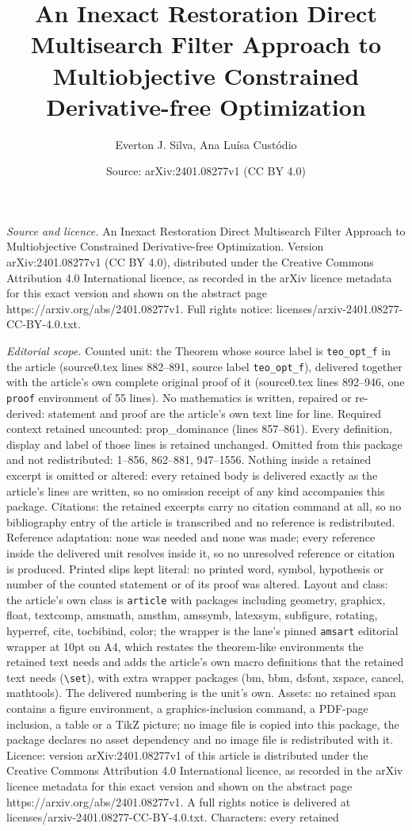 \documentclass[10pt,a4paper]{amsart}
\title[An Inexact Restoration Direct Multisearch Filter Approach to]{An Inexact Restoration Direct Multisearch Filter Approach to Multiobjective Constrained Derivative-free Optimization}
\author{Everton J. Silva, Ana Lu\'isa Cust\'odio}
\date{Source: arXiv:2401.08277v1 (CC BY 4.0)}
\begin{document}
\maketitle

\noindent\emph{Source and licence.} An Inexact Restoration Direct Multisearch Filter Approach to Multiobjective Constrained Derivative-free Optimization. Version arXiv:2401.08277v1 (CC BY 4.0), distributed under the Creative Commons Attribution 4.0 International licence, as recorded in the arXiv licence metadata for this exact version and shown on the abstract page https://arxiv.org/abs/2401.08277v1. Full rights notice: licenses/arxiv-2401.08277-CC-BY-4.0.txt.\par\smallskip

\noindent\textit{Editorial scope.} Counted unit: the Theorem whose source label is \texttt{teo\_opt\_f} in the article (source0.tex lines 882--891, source label \texttt{teo\_opt\_f}), delivered together with the article's own complete original proof of it (source0.tex lines 892--946, one \texttt{proof} environment of 55 lines). No mathematics is written, repaired or re-derived: statement and proof are the article's own text line for line. Required context retained uncounted: prop\_dominance (lines 857--861). Every definition, display and label of those lines is retained unchanged. Omitted from this package and not redistributed: 1--856, 862--881, 947--1556. Nothing inside a retained excerpt is omitted or altered: every retained body is delivered exactly as the article's lines are written, so no omission receipt of any kind accompanies this package. Citations: the retained excerpts carry no citation command at all, so no bibliography entry of the article is transcribed and no reference is redistributed. Reference adaptation: none was needed and none was made; every reference inside the delivered unit resolves inside it, so no unresolved reference or citation is produced. Printed slips kept literal: no printed word, symbol, hypothesis or number of the counted statement or of its proof was altered. Layout and class: the article's own class is \texttt{article} with packages including geometry, graphicx, float, textcomp, amsmath, amsthm, amssymb, latexsym, subfigure, rotating, hyperref, cite, tocbibind, color; the wrapper is the lane's pinned \texttt{amsart} editorial wrapper at 10pt on A4, which restates the theorem-like environments the retained text needs and adds the article's own macro definitions that the retained text needs (\texttt{\textbackslash set}), with extra wrapper packages (bm, bbm, dsfont, xspace, cancel, mathtools). The delivered numbering is the unit's own. Assets: no retained span contains a figure environment, a graphics-inclusion command, a PDF-page inclusion, a table or a TikZ picture; no image file is copied into this package, the package declares no asset dependency and no image file is redistributed with it. Licence: version arXiv:2401.08277v1 of this article is distributed under the Creative Commons Attribution 4.0 International licence, as recorded in the arXiv licence metadata for this exact version and shown on the abstract page https://arxiv.org/abs/2401.08277v1. A full rights notice is delivered at licenses/arxiv-2401.08277-CC-BY-4.0.txt. Characters: every retained 
\end{document}
